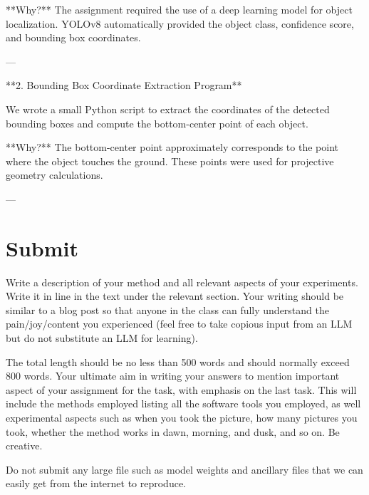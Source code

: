 \documentclass[12pt,a4paper]{article}
\newenvironment{studentSpace}{\par\medskip\noindent}{\par\bigskip}
\begin{document}
\begin{enumerate}
\begin{studentSpace}
**Why?**
The assignment required the use of a deep learning model for object localization. YOLOv8 automatically provided the object class, confidence score, and bounding box coordinates.

---

**2. Bounding Box Coordinate Extraction Program**

We wrote a small Python script to extract the coordinates of the detected bounding boxes and compute the bottom-center point of each object.

**Why?**
The bottom-center point approximately corresponds to the point where the object touches the ground. These points were used for projective geometry calculations.

---


\vspace{5cm}
\end{studentSpace}

\end{enumerate}

\section{Submit}

Write a description of your method and all relevant aspects of your
experiments. Write it in line in the text under the relevant section. Your writing should be similar to a blog post so that anyone in the class can fully understand the pain/joy/content you experienced (feel free to take copious input from an LLM but do not substitute an LLM for learning).

The total length should be no less than 500 words and
should normally exceed 800 words. Your ultimate aim in writing your answers
to mention important aspect of your assignment for the task, with
emphasis on the last task. This will include the methods employed
listing all the software tools you employed, as well experimental
aspects such as when you took the picture, how many pictures
you took, whether the method works in dawn, morning, and dusk, and so
on. Be creative.

Do not submit any large file such as
model weights and ancillary files that we can easily get from the
internet to reproduce.
\end{document}
